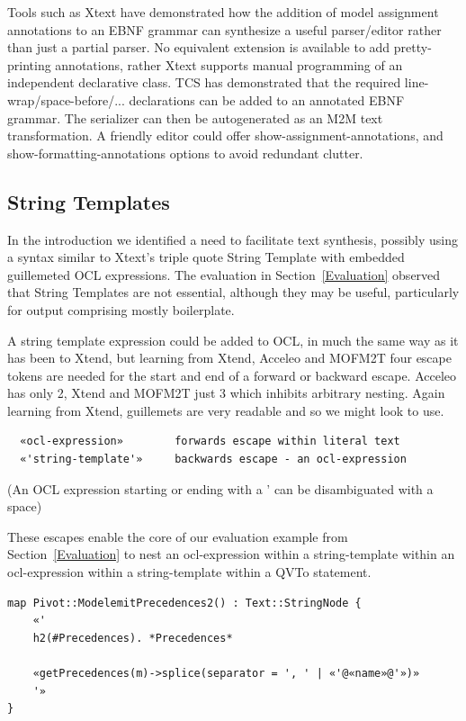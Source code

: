 \documentclass{llncs}
\begin{document}
Tools such as Xtext have demonstrated how the addition of model assignment annotations to an EBNF grammar can synthesize a useful parser/editor rather than just a partial parser. No equivalent extension is available to add pretty-printing annotations, rather Xtext supports manual programming of an independent declarative class. TCS \cite{TCS} has demonstrated that the required line-wrap/space-before/... declarations can be added to an annotated EBNF grammar. The serializer can then be autogenerated as an M2M text transformation. A friendly editor could offer show-assignment-annotations, and show-formatting-annotations options to avoid redundant clutter.

\subsection{String Templates}\label{String Templates}

In the introduction we identified a need to facilitate text synthesis, possibly using a syntax similar to Xtext's triple quote String Template with embedded guillemeted OCL expressions.
The evaluation in Section~\ref{Evaluation} observed that String Templates are not essential, although they may be useful, particularly for output comprising mostly boilerplate.

A string template expression could be added to OCL, in much the same way as it has been to Xtend, 
but learning from Xtend, Acceleo and MOFM2T four escape tokens are needed for the start and end of  a forward or backward escape. Acceleo has only 2, Xtend and MOFM2T just 3 which inhibits arbitrary nesting. Again learning from Xtend, guillemets are very readable and so we might look to use.

\begin{verbatim}
  «ocl-expression»        forwards escape within literal text
  «'string-template'»     backwards escape - an ocl-expression
\end{verbatim}

(An OCL expression starting or ending with a ' can be disambiguated with a space)

These escapes enable the core of our evaluation example from Section~\ref{Evaluation} to nest an ocl-expression within a string-template within an ocl-expression within a string-template within a QVTo statement.

\begin{verbatim}
map Pivot::ModelemitPrecedences2() : Text::StringNode {
    «'
    h2(#Precedences). *Precedences*
	
    «getPrecedences(m)->splice(separator = ', ' | «'@«name»@'»)»
    '»
}
\end{verbatim}
\end{document}
